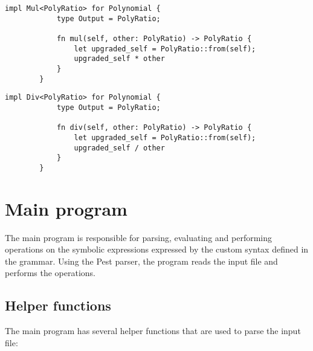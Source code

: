     \begin{lstlisting}[caption={The implementation of the multiplication operation between \texttt{Polynomial} and \texttt{PolyRatio}}, label={lst:polyratio-polynomial-mul}]
        impl Mul<PolyRatio> for Polynomial {
            type Output = PolyRatio;
        
            fn mul(self, other: PolyRatio) -> PolyRatio {
                let upgraded_self = PolyRatio::from(self);
                upgraded_self * other
            }
        }
    \end{lstlisting}

    \begin{lstlisting}[caption={The implementation of the division operation between \texttt{Polynomial} and \texttt{PolyRatio}}, label={lst:polyratio-polynomial-div}]
        impl Div<PolyRatio> for Polynomial {
            type Output = PolyRatio;
        
            fn div(self, other: PolyRatio) -> PolyRatio {
                let upgraded_self = PolyRatio::from(self);
                upgraded_self / other
            }
        }
    \end{lstlisting}

\section{Main program}\label{sec:main-program}

The main program is responsible for parsing, evaluating and performing operations on the symbolic expressions expressed by the custom syntax defined in the grammar. Using the Pest parser, the program reads the input file and performs the operations.

\subsection{Helper functions}\label{subsec:helper-functions}

The main program has several helper functions that are used to parse the input file:


